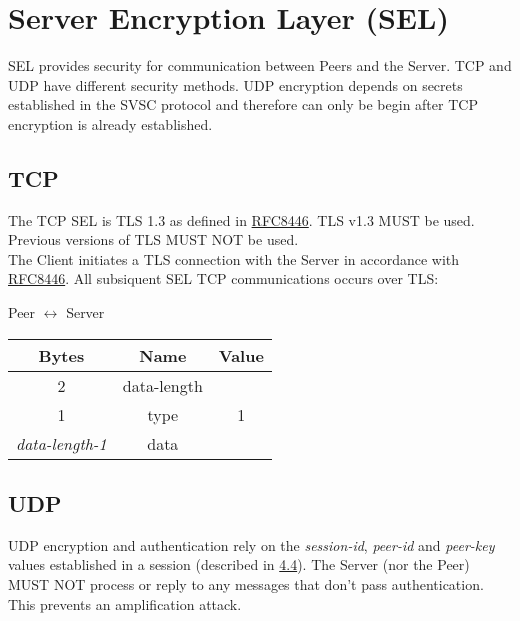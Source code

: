 \section{Server Encryption Layer (SEL)}

SEL provides security for communication between Peers and the Server. TCP and UDP have
different security methods. UDP encryption depends on secrets established in the SVSC protocol and therefore can only
be begin after TCP encryption is already established.

\subsection{TCP}

The TCP SEL is TLS 1.3 as defined in
\href{https://datatracker.ietf.org/doc/html/rfc8446}{RFC8446}. TLS v1.3 MUST be used. Previous versions of TLS MUST NOT be used.\\

The Client initiates a TLS connection with the Server in accordance with \href{https://datatracker.ietf.org/doc/html/rfc8446}{RFC8446}. All subsiquent SEL TCP communications occurs over TLS:

\begin{center}
    Peer $\leftrightarrow$ Server\\
    \begin{tabular}{|c|c|c|}
        \hline
        \textbf{Bytes}       & \textbf{Name} & \textbf{Value} \\
        \hline
        2                    & data-length   &                \\
        \hline
        1                    & type          & 1              \\
        \hline
        \emph{data-length-1} & data          &                \\
        \hline
    \end{tabular}
\end{center}

\subsection{UDP}

UDP encryption and authentication rely on the \emph{session-id}, \emph{peer-id} and \emph{peer-key} values
established in a session
(described in \hyperlink{subsection.4.4}{4.4}). The Server (nor the Peer) MUST NOT
process or reply to any messages that don't pass authentication. This prevents an amplification attack.\\

